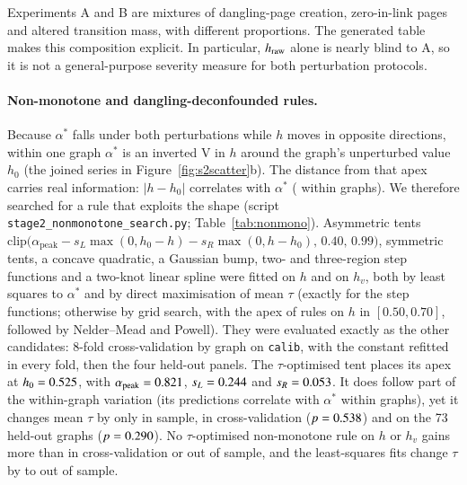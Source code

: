 \documentclass[11pt,a4paper]{article}
\theoremstyle{definition}
\theoremstyle{remark}
\newcommand{\clip}{\mathrm{clip}}
\begin{document}




Experiments A and B are mixtures of dangling-page creation, zero-in-link pages and altered
transition mass, with different proportions. The generated table makes this composition explicit.
In particular, $h_{\rm raw}$ alone is nearly blind to A, so it is not a general-purpose severity
measure for both perturbation protocols.

\paragraph{Non-monotone and dangling-deconfounded rules.}
Because $\alpha^*$ falls under both perturbations while $h$ moves in opposite directions, within one
graph $\alpha^*$ is an inverted V in $h$ around the graph's unperturbed value $h_0$ (the joined series in
Figure~\ref{fig:s2scatter}b). The distance from that apex carries real information: $|h-h_0|$
correlates \NmDistOwn{} with $\alpha^*$ (\NmDistOwnWithin{} within graphs). We therefore searched for a
rule that exploits the shape (script \texttt{stage2\_nonmonotone\_search.py}; Table~\ref{tab:nonmono}).
Asymmetric tents
$\clip\bigl(\alpha_{\mathrm{peak}}-s_L\max(0,h_0-h)-s_R\max(0,h-h_0),\,0.40,\,0.99\bigr)$, symmetric
tents, a concave quadratic, a Gaussian bump, two- and three-region step functions and a two-knot linear
spline were fitted on $h$ and on $h_v$, both by least squares to $\alpha^*$ and by direct maximisation
of mean $\tau$ (exactly for the step functions; otherwise by grid search, with the apex of rules on
$h$ in $[0.50,0.70]$, followed by Nelder--Mead and Powell). They were
evaluated exactly as the other candidates: 8-fold cross-validation by graph on \texttt{calib}, with the
constant refitted in every fold, then the four held-out panels. The $\tau$-optimised tent places its
apex at $h_0=0.525$, with $\alpha_{\mathrm{peak}}=0.821$, $s_L=0.244$ and
$s_R=0.053$. It does follow part of the within-graph variation (its predictions correlate
\NmTentWithin{} with $\alpha^*$ within graphs), yet it changes mean $\tau$ by only \NmTentCalib{} in
sample, \NmTentCV{} in cross-validation ($p=0.538$) and \NmTentHeld{} on the 73 held-out graphs
($p=0.290$). No $\tau$-optimised non-monotone rule on $h$ or $h_v$ gains more than
\NmMaxOneDCV{} in cross-validation or \NmMaxOneDHeld{} out of sample, and the least-squares fits change
$\tau$ by \NmLSBest{} to \NmLSWorst{} out of sample.
\end{document}
